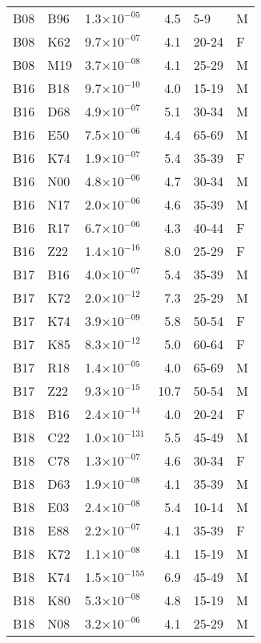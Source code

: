 \begin{longtable}{lllrll}
   B08 & B96 & 1.3$\times10^{-05}$ & 4.5 & 5-9 & M \\ 
   B08 & K62 & 9.7$\times10^{-07}$ & 4.1 & 20-24 & F \\ 
   B08 & M19 & 3.7$\times10^{-08}$ & 4.1 & 25-29 & M \\ 
   B16 & B18 & 9.7$\times10^{-10}$ & 4.0 & 15-19 & M \\ 
   B16 & D68 & 4.9$\times10^{-07}$ & 5.1 & 30-34 & M \\ 
   B16 & E50 & 7.5$\times10^{-06}$ & 4.4 & 65-69 & M \\ 
   B16 & K74 & 1.9$\times10^{-07}$ & 5.4 & 35-39 & F \\ 
   B16 & N00 & 4.8$\times10^{-06}$ & 4.7 & 30-34 & M \\ 
   B16 & N17 & 2.0$\times10^{-06}$ & 4.6 & 35-39 & M \\ 
   B16 & R17 & 6.7$\times10^{-06}$ & 4.3 & 40-44 & F \\ 
   B16 & Z22 & 1.4$\times10^{-16}$ & 8.0 & 25-29 & F \\ 
   B17 & B16 & 4.0$\times10^{-07}$ & 5.4 & 35-39 & M \\ 
   B17 & K72 & 2.0$\times10^{-12}$ & 7.3 & 25-29 & M \\ 
   B17 & K74 & 3.9$\times10^{-09}$ & 5.8 & 50-54 & F \\ 
   B17 & K85 & 8.3$\times10^{-12}$ & 5.0 & 60-64 & F \\ 
   B17 & R18 & 1.4$\times10^{-05}$ & 4.0 & 65-69 & M \\ 
   B17 & Z22 & 9.3$\times10^{-15}$ & 10.7 & 50-54 & M \\ 
   B18 & B16 & 2.4$\times10^{-14}$ & 4.0 & 20-24 & F \\ 
   B18 & C22 & 1.0$\times10^{-131}$ & 5.5 & 45-49 & M \\ 
   B18 & C78 & 1.3$\times10^{-07}$ & 4.6 & 30-34 & F \\ 
   B18 & D63 & 1.9$\times10^{-08}$ & 4.1 & 35-39 & M \\ 
   B18 & E03 & 2.4$\times10^{-08}$ & 5.4 & 10-14 & M \\ 
   B18 & E88 & 2.2$\times10^{-07}$ & 4.1 & 35-39 & F \\ 
   B18 & K72 & 1.1$\times10^{-08}$ & 4.1 & 15-19 & M \\ 
   B18 & K74 & 1.5$\times10^{-155}$ & 6.9 & 45-49 & M \\ 
   B18 & K80 & 5.3$\times10^{-08}$ & 4.8 & 15-19 & M \\ 
   B18 & N08 & 3.2$\times10^{-06}$ & 4.1 & 25-29 & M \\ 

\end{longtable}
